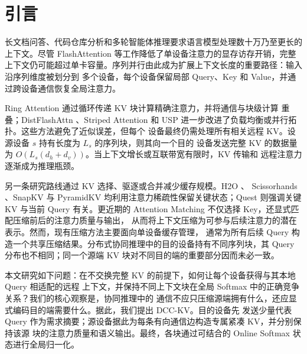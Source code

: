 \documentclass[sigconf,nonacm]{acmart}
\begin{document}

\maketitle

\section{引言}
\label{sec:intro}

长文档问答、代码仓库分析和多轮智能体推理要求语言模型处理数十万乃至更长的上下文。尽管
FlashAttention \cite{dao2022flashattention,dao2023flashattention2} 等工作降低了单设备注意力的显存访存开销，完整
上下文仍可能超过单卡容量。序列并行由此成为扩展上下文长度的重要路径：输入沿序列维度被划分到
多个设备，每个设备保留局部 Query、Key 和 Value，并通过跨设备通信恢复全局注意力。

Ring Attention \cite{liu2023ring} 通过循环传递 KV 块计算精确注意力，并将通信与块级计算
重叠；DistFlashAttn \cite{li2024distflash}、Striped Attention \cite{brandon2023striped}
和 USP \cite{fang2024usp} 进一步改进了负载均衡或并行拓扑。这些方法避免了近似误差，但每个
设备最终仍需处理所有相关远程 KV。设源设备 $s$ 持有长度为 $L_s$ 的序列块，则其向一个目的
设备发送完整 KV 的数据量为 $O(L_s(d_h + d_v))$。当上下文增长或互联带宽有限时，KV 传输和
远程注意力逐渐成为推理瓶颈。

另一条研究路线通过 KV 选择、驱逐或合并减少缓存规模。H2O \cite{zhang2023h2o}、
Scissorhands \cite{liu2023scissorhands}、SnapKV \cite{li2024snapkv} 与
PyramidKV \cite{cai2024pyramidkv} 均利用注意力稀疏性保留关键状态；Quest \cite{tang2024quest}
则强调关键 KV 与当前 Query 有关。更近期的 Attention Matching
\cite{zweiger2026attentionmatching} 不仅选择 Key，还显式匹配压缩前后的注意力质量与输出，
从而将上下文压缩为可参与后续注意力的潜在表示。然而，现有压缩方法主要面向单设备缓存管理，
通常为所有后续 Query 构造一个共享压缩结果。分布式协同推理中的目的设备持有不同序列块，其
Query 分布也不相同；同一个源端 KV 块对不同目的端的重要部分因而未必一致。

本文研究如下问题：在不交换完整 KV 的前提下，如何让每个设备获得与其本地 Query 相适配的远程
上下文，并保持不同上下文块在全局 Softmax 中的正确竞争关系？我们的核心观察是，协同推理中的
通信不应只压缩源端拥有什么，还应显式编码目的端需要什么。据此，我们提出 DCC-KV。目的设备先
发送少量代表 Query 作为需求摘要；源设备据此为每条有向通信边构造专属紧凑 KV，并分别保持该源
块的注意力质量和语义输出。最终，各块通过可结合的 Online Softmax 状态进行全局归一化。
\end{document}
